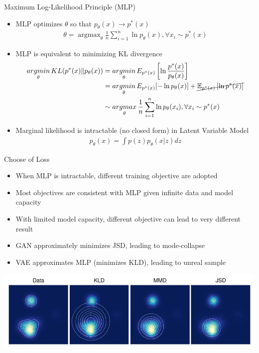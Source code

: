 \documentclass[compress]{beamer}
\newcommand{\expects}[2]{\mathbb{E}_{#1} \left[ #2 \right]}
\begin{document}
\begin{frame}{Maximum Log-Likelihood Principle (MLP)}
    \begin{itemize}
        \item MLP optimizes $\theta$ so that $p_{\theta}(x)\rightarrow p^*(x)$
            \begin{align*}
                \theta = \mathop{argmax}_{\theta} \frac{1}{n}\sum_{i=1}^n \ln p_{\theta}(x), \forall x_i \sim p^*(x)
            \end{align*}
        \item MLP is equivalent to minimizing KL divergence
            \begin{align*}
                \mathop{argmin}_{\theta} KL(p^*(x)\|p_{\theta}(x)) & = \mathop{argmin}_{\theta} E_{p^*(x)} \left[ \ln \frac{p^*(x)}{p_{\theta}(x)}  \right]
                 \\
                                                                   & = \mathop{argmin}_{\theta} E_{p^*(x)}[-\ln p_{\theta}(x)] + \cancel{\expects{p^*(x)}{\ln p^*(x)}}\\
                                                                   & \sim \mathop{argmax}_{\theta} \frac{1}{n}\sum_{i=1}^n \ln p_{\theta}(x_i), \forall x_i \sim p^*(x)
            \end{align*}
        \item Marginal likelihood is intractable (no closed form) in Latent Variable Model
            \begin{align*}
                p_{\theta}(x) = \int p(z)p_{\theta}(x|z) dz
            \end{align*}
    \end{itemize}
\end{frame}

\begin{frame}[t]{Choose of Loss}
    \begin{itemize}
        \item When MLP is intractable, different training objective are adopted
        \item Most objectives are consistent with MLP given infinite data and model capacity
        \item With limited model capacity, different objective can lead to very different result
        \item GAN approximately minimizes JSD, leading to mode-collapse
        \item VAE approximates MLP (minimizes KLD), leading to unreal sample
    \end{itemize}
    \includegraphics[height=0.4\textheight,width=\textwidth]{loss}
\end{frame}
\end{document}
